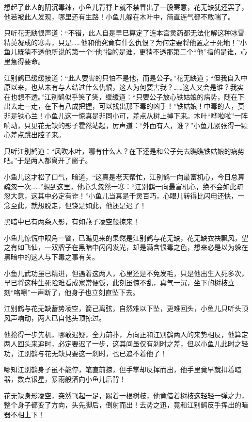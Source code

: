 \documentclass[12pt,oneside]{book}
\begin{document}
想起了此人的阴沉毒辣，小鱼儿背脊上就不禁冒出了一股寒意，花无缺犹还罢了，他若被此人发现，哪里还有生路！小鱼儿躲在木叶中，简直连气都不敢喘了。

只听花无缺恨声道：``不错，此人自是早巳算定了连本宫灵药都无法化解这种冰雪精英凝成的寒毒，只是\ldots\ldots 他和他究竟有什么仇恨？为何定要将他置之于死地！''小鱼儿既猜不透他所说的第一个``他''指的是谁，更猜不透那第二个``他''指的是谁，心里急得要命。

江别鹤已缓缓接道：``此人要害的只怕不是他，而是公子。''花无缺道；``但我自入中原以来，也从未有与人结过什么仇恨，这人为何要害我？\ldots\ldots 这人又会是谁？我实在也想不透。''江别鹤似乎笑了笑，缓缓道：``只要公子放心铁姑娘的病势，随在下出去走一走，在下有八成把握，可以找出那下毒的凶手！''铁姑娘！中毒的人，莫非是铁心兰！小鱼儿这一惊真是非同小可，差点从树上掉下来。木叶``哗啦啦''一阵响动，只见花无缺的影子霍然站起，厉声道：``外面有人，谁？''小鱼儿紧张得一颗心差点跳出腔子来。

只听江别鹤道：``风吹木叶，哪有什么人？在下还是和公子先去瞧瞧铁姑娘的病势吧。''于是两人都离开了窗子。

小鱼儿这才松了口气，暗道，``这真是老天帮忙，江别鹤一向最富机心，今日总算疏忽一次\ldots\ldots{}''想到这里，他心头忽然一寒：``江别鹤一向最富机心，绝不会如此疏忽大意，这其中必定有诈！''小鱼儿当真是千灵百巧，心眼儿转得比闪电还快，一念至此，就想脱走，但饶是如此，他还是迟了！

黑暗中已有两条人影，有如燕子凌空般掠来！

小鱼儿惊慌中眼角一瞥，已瞧见来的果然是江别鹤与花无缺，花无缺衣袂飘风，望之有如飞仙，一双牌子在黑暗中闪闪发光，却是满含恨毒之色，想来必是以为躲在黑暗中的这人与下毒之事有关。

小鱼儿武功虽已精进，但遇着这两人，心里还是不免发毛，只是他出生入死多次，早已将这种生死险难看成家常便饭，此刻虽惊不乱，真气一沉，坐下的树枝立刻``咯嚓''一声断了，他身子也立刻直坠下去。

江别鹤与花无缺蓄势凌空，箭己离弦，自然难以下坠，更难回头，小鱼儿只听头顶风声响动，两人已自他头顶掠过。

他抢得一步先机，哪敢迟疑，全力前扑，方向正和江别鹤两人的来势相反，他算定两人回头来追时，必定要迟了一步，这其间虽仅有刹时之差，但以小鱼儿此时之轻功，江别鹤与花无缺只要这一刹时，也已追不着他了！

哪知江别鹤身子虽不能停，笔直前掠，但手掌却反挥而出，他手里竟早就扣着暗器，数点银星，暴雨般洒向小鱼儿后背！

花无缺身形凌空，突然飞起一足，踢着一根树枝，他竟借着树枝这轻轻一弹之力，整个身子都变了方向，头先脚后，倒射而出！去势之迅，竟和江别鹤反手挥出的暗器不相上下！
\end{document}
